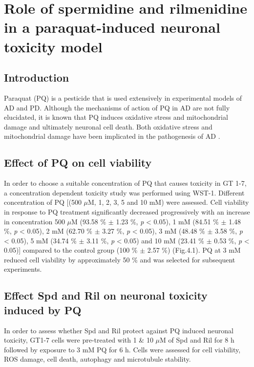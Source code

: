 \chapter{Role of spermidine and rilmenidine in a paraquat-induced neuronal toxicity model}
\section{Introduction}
Paraquat (PQ) is a pesticide that is used extensively in experimental models of AD and PD. Although the mechanisms of action of PQ in AD are not fully elucidated, it is known that PQ induces oxidative stress and mitochondrial damage \citep{Chen2012} and ultimately neuronal cell death. Both oxidative stress and mitochondrial damage have been implicated in the pathogenesis of AD \citep{Chen2012,Lin2006}. 

\section{Effect of PQ on cell viability}
In order to choose a suitable concentration of PQ that causes toxicity in GT 1-7, a concentration dependent toxicity study was performed using WST-1. Different concentration of PQ [(500 $\mu$M, 1, 2, 3, 5 and 10 mM) were assessed. Cell viability in response to PQ treatment significantly decreased progressively with an increase in concentration 500 $\mu$M (93.58 \% $\pm$ 1.23 \%, \textit{p} < 0.05), 1 mM (84.51 \% $\pm$ 1.48 \%, \textit{p} < 0.05), 2 mM (62.70 \% $\pm$ 3.27 \%, \textit{p} < 0.05), 3 mM (48.48 \% $\pm$ 3.58 \%, \textit{p} < 0.05), 5 mM (34.74 \% $\pm$ 3.11 \%, \textit{p} < 0.05) and 10 mM (23.41 \% $\pm$ 0.53 \%, \textit{p} < 0.05)] compared to the control group (100 \% $\pm$ 2.57 \%) (Fig.4.1). PQ at 3 mM reduced cell viability by approximately 50 \% and was selected for subsequent experiments.
\section{Effect Spd and Ril on neuronal toxicity induced by PQ}
In order to assess whether Spd and Ril protect against PQ induced neuronal toxicity, GT1-7 cells were pre-treated with 1 \& 10 $\mu$M of Spd and Ril for 8 h followed by exposure to 3 mM PQ for 6 h. Cells were assessed for cell viability, ROS damage, cell death, autophagy and microtubule stability.

